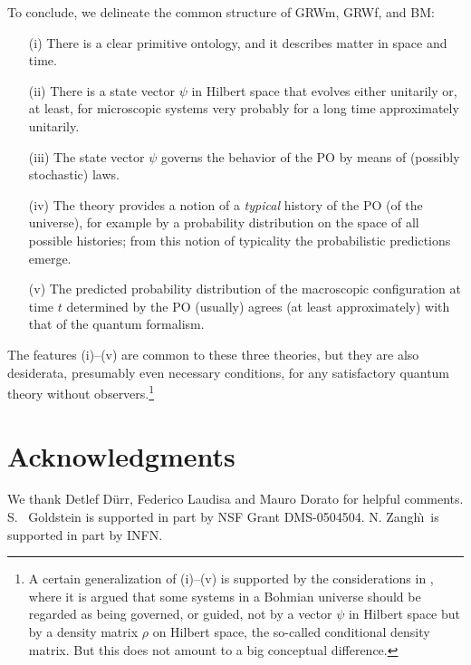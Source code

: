 \documentclass[12pt]{article}
\begin{document}
To conclude, we delineate the common structure of
{\sf GRWm}, {\sf GRWf}, and {\sf BM}:

\begin{itemize}
\item[(i)] There is a clear primitive ontology, and it describes
  matter in space and time.
\item[(ii)] There is a state vector $\psi$ in Hilbert space that
  evolves either unitarily or, at least, for microscopic systems very  probably for a long time approximately unitarily. 
\item[(iii)] The state vector $\psi$ governs the behavior of the \textrm{PO} by
  means of (possibly stochastic) laws.
\item[(iv)] The theory provides a notion of a \emph{typical}
  history of the \textrm{PO} (of the universe), for example by a probability 
  distribution on the space of all possible histories; from this 
  notion of typicality the probabilistic predictions
  emerge.
\item[(v)] The predicted probability distribution of the macroscopic
  configuration at time $t$ determined by the \textrm{PO} (usually) agrees (at least approximately)
 with that of the quantum formalism.
\end{itemize}

The features (i)--(v) are common to these three theories, but they
are also desiderata, presumably even necessary conditions, for any
satisfactory quantum theory without observers.\footnote{A certain generalization of (i)--(v) is supported by the considerations in \citep{dm}, where it is argued that some systems in a Bohmian universe should be regarded as being governed, or guided, not by a vector $\psi$ in Hilbert space but by a density matrix $\rho$ on Hilbert space, the so-called conditional density matrix. But this does not amount to a big conceptual difference.}

\section*{Acknowledgments}
We thank Detlef D\"urr, Federico Laudisa and Mauro Dorato for helpful comments. 
S.~ Goldstein is supported in part by NSF Grant DMS-0504504. N. Zangh\`\i\ is supported in part by INFN. 
\end{document}
